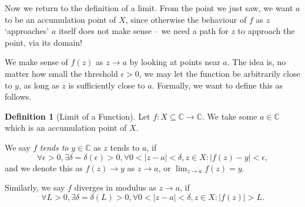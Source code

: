\documentclass[11pt]{article}
\numberwithin{equation}{section}
\theoremstyle{definition}
\newtheorem{definition}[theorem]{Definition}
\theoremstyle{remark}
\newcommand{\pqty}[1]{\left(#1\right)}
\newcommand{\abs}[1]{\left|#1\right|}
\newcommand{\functiondomain}[3]{#1:#2\to #3}
\newcommand{\CC}{\mathbb C}
\begin{document}
Now we return to the definition of a limit. From the point we just saw, we want \(a\) to be an accumulation point of \(X\), since otherwise the behaviour of \(f\) as \(z\) `approaches' \(a\) itself does not make sense -- we need a path for \(z\) to approach the point, via its domain! 

We make sense of \(f\pqty{z}\) as \(z \to a\) by looking at points near \(a\). The idea is, no matter how small the threshold \(\epsilon > 0\), we may let the function be arbitrarily close to \(y\), as long as \(z\) is sufficiently close to \(a\). Formally, we want to define this as follows.

\begin{definition}[Limit of a Function]\label{analysis-unit-0072}
    \label{def:fn-limit}%
    Let \(\functiondomain{f}{X \subseteq \CC}{\CC}\). We take some \(a \in \CC\) which is an accumulation point of \(X\).


    We say \(f\) \emph{tends to} \(y \in \CC\) as \(z\) tends to \(a\), if
    \[
        \forall \epsilon > 0, \exists \delta = \delta \pqty{\epsilon} > 0, \forall 0 < \abs{z - a} < \delta, z \in X: \abs{f\pqty{z} - y} < \epsilon,
    \]
    and we denote this as \(f\pqty{z} \to y\) as \(z \to a\), or \(\lim_{z \to a} f\pqty{z} = y\).

    Similarly, we say \(f\) diverges in modulus as \(z \to a\), if
    \[
        \forall L > 0, \exists \delta = \delta\pqty{L} > 0, \forall 0 < \abs{z - a} < \delta, z \in X: \abs{f\pqty{z}} > L.
    \]
\end{definition}
\end{document}
